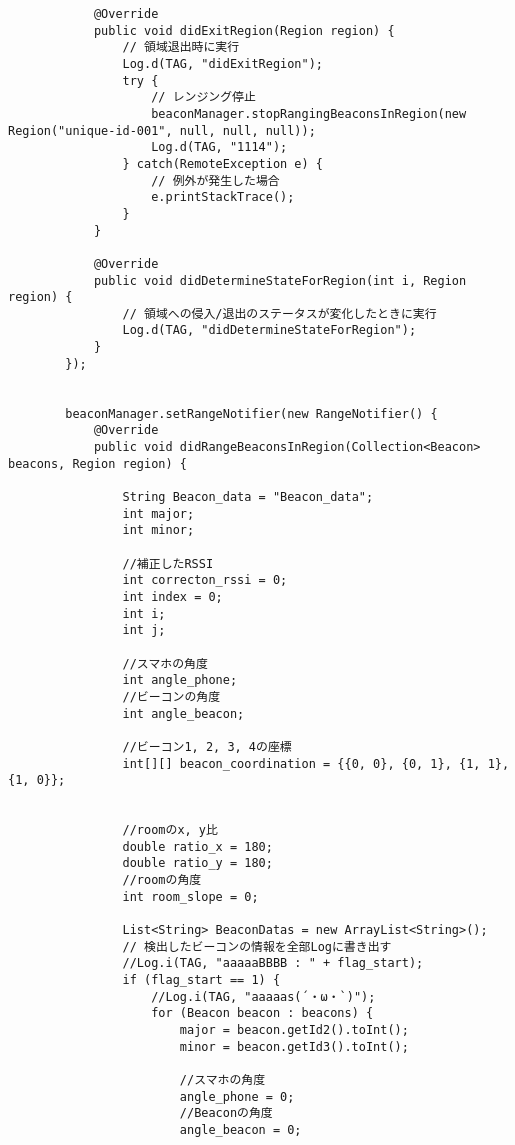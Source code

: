 \documentclass[11pt,a4j]{jarticle}
\begin{document}
\begin{verbatim}
            @Override
            public void didExitRegion(Region region) {
                // 領域退出時に実行
                Log.d(TAG, "didExitRegion");
                try {
                    // レンジング停止
                    beaconManager.stopRangingBeaconsInRegion(new Region("unique-id-001", null, null, null));
                    Log.d(TAG, "1114");
                } catch(RemoteException e) {
                    // 例外が発生した場合
                    e.printStackTrace();
                }
            }

            @Override
            public void didDetermineStateForRegion(int i, Region region) {
                // 領域への侵入/退出のステータスが変化したときに実行
                Log.d(TAG, "didDetermineStateForRegion");
            }
        });


        beaconManager.setRangeNotifier(new RangeNotifier() {
            @Override
            public void didRangeBeaconsInRegion(Collection<Beacon> beacons, Region region) {

                String Beacon_data = "Beacon_data";
                int major;
                int minor;

                //補正したRSSI
                int correcton_rssi = 0;
                int index = 0;
                int i;
                int j;

                //スマホの角度
                int angle_phone;
                //ビーコンの角度
                int angle_beacon;

                //ビーコン1, 2, 3, 4の座標
                int[][] beacon_coordination = {{0, 0}, {0, 1}, {1, 1}, {1, 0}};


                //roomのx, y比
                double ratio_x = 180;
                double ratio_y = 180;
                //roomの角度
                int room_slope = 0;

                List<String> BeaconDatas = new ArrayList<String>();
                // 検出したビーコンの情報を全部Logに書き出す
                //Log.i(TAG, "aaaaaBBBB : " + flag_start);
                if (flag_start == 1) {
                    //Log.i(TAG, "aaaaas(´・ω・`)");
                    for (Beacon beacon : beacons) {
                        major = beacon.getId2().toInt();
                        minor = beacon.getId3().toInt();

                        //スマホの角度
                        angle_phone = 0;
                        //Beaconの角度
                        angle_beacon = 0;


\end{verbatim}
\end{document}
